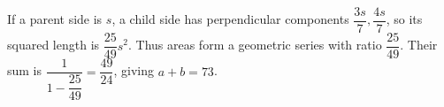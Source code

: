 If a parent side is $s$, a child side has perpendicular components $\dfrac{3s}{7},\dfrac{4s}{7}$, so its squared length is $\dfrac{25}{49}s^2$. Thus areas form a geometric series with ratio $\dfrac{25}{49}$. Their sum is $\dfrac{1}{1-\dfrac{25}{49}}=\dfrac{49}{24}$, giving $\boxed{a+b=73}$.
